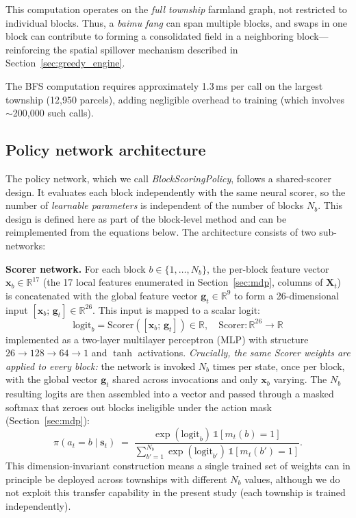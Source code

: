 \documentclass[preprint,12pt]{elsarticle}
\begin{document}
This computation operates on the \textit{full township} farmland graph, not restricted to individual blocks. Thus, a \textit{baimu fang} can span multiple blocks, and swaps in one block can contribute to forming a consolidated field in a neighboring block---reinforcing the spatial spillover mechanism described in Section~\ref{sec:greedy_engine}.

The BFS computation requires approximately 1.3\,ms per call on the largest township (12{,}950 parcels), adding negligible overhead to training (which involves $\sim$200{,}000 such calls).

\subsection{Policy network architecture}
\label{sec:policy}

The policy network, which we call \textit{BlockScoringPolicy}, follows a shared-scorer design. It evaluates each block independently with the same neural scorer, so the number of \textit{learnable parameters} is independent of the number of blocks $N_b$. This design is defined here as part of the block-level method and can be reimplemented from the equations below. The architecture consists of two sub-networks:

\textbf{Scorer network.} For each block $b \in \{1,\dots,N_b\}$, the per-block feature vector $\mathbf{x}_b \in \mathbb{R}^{17}$ (the 17 local features enumerated in Section~\ref{sec:mdp}, columns of $\mathbf{X}_t$) is concatenated with the global feature vector $\mathbf{g}_t \in \mathbb{R}^{9}$ to form a 26-dimensional input $[\mathbf{x}_b;\, \mathbf{g}_t] \in \mathbb{R}^{26}$. This input is mapped to a scalar logit:
\begin{equation}
\text{logit}_b = \text{Scorer}\!\left([\mathbf{x}_b;\, \mathbf{g}_t]\right) \in \mathbb{R}, \quad \text{Scorer}: \mathbb{R}^{26} \to \mathbb{R}
\end{equation}
implemented as a two-layer multilayer perceptron (MLP) with structure $26 \to 128 \to 64 \to 1$ and $\tanh$ activations. \textit{Crucially, the same Scorer weights are applied to every block:} the network is invoked $N_b$ times per state, once per block, with the global vector $\mathbf{g}_t$ shared across invocations and only $\mathbf{x}_b$ varying. The $N_b$ resulting logits are then assembled into a vector and passed through a masked softmax that zeroes out blocks ineligible under the action mask (Section~\ref{sec:mdp}):
\begin{equation}
\pi(a_t = b \mid \mathbf{s}_t) \;=\; \frac{\exp(\text{logit}_b)\,\mathbb{1}[m_t(b)=1]}{\sum_{b'=1}^{N_b}\exp(\text{logit}_{b'})\,\mathbb{1}[m_t(b')=1]}.
\end{equation}
This dimension-invariant construction means a single trained set of weights can in principle be deployed across townships with different $N_b$ values, although we do not exploit this transfer capability in the present study (each township is trained independently).
\end{document}
